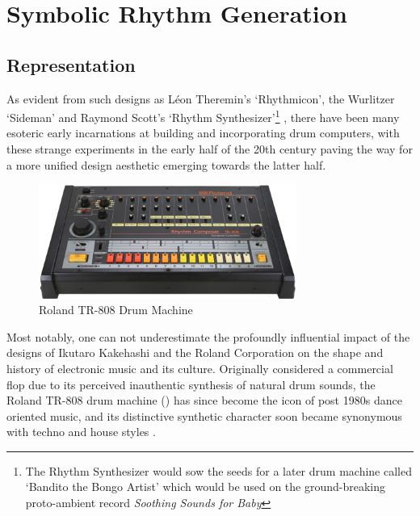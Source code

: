 \section{Symbolic Rhythm Generation}

\subsection{Representation}

As evident from such designs as Léon Theremin's `Rhythmicon', the Wurlitzer `Sideman' and Raymond Scott's `Rhythm Synthesizer'\footnote{The Rhythm Synthesizer would sow the seeds for a later drum machine called `Bandito the Bongo Artist' which would be used on the ground-breaking proto-ambient record \textit{Soothing Sounds for Baby}\citep{Collins2011a}} \citep{Tindale2009, Malmberg2010, Arar2013}, there have been many esoteric early incarnations at building and incorporating drum computers, with these strange experiments in the early half of the 20th century paving the way for a more unified design aesthetic emerging towards the latter half. 

\begin{figure}
	\begin{center}
		\includegraphics[width=0.75\textwidth]{ch03_symbolic/figures/tr-808.png}
	\end{center}
	\caption[Roland TR-808 Drum Machine]{Roland TR-808 Drum Machine}
	\label{fig:tr-808}
\end{figure}


Most notably, one can not underestimate the profoundly influential impact of the designs of Ikutaro Kakehashi and the Roland Corporation on the shape and history of electronic music and its culture. Originally considered a commercial flop due to its perceived inauthentic synthesis of natural drum sounds, the Roland TR-808 drum machine () has since become the icon of post 1980s dance oriented music, and its distinctive synthetic character soon became synonymous with techno and house styles \citep{theberge1997any}.

